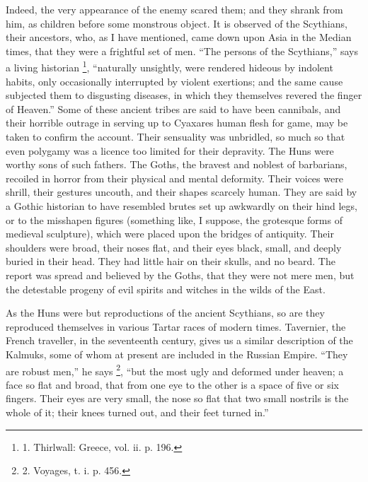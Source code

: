 Indeed, the very appearance of
the enemy scared them; and they shrank from him, as children before
some monstrous object. It is observed of the Scythians, their
ancestors, who, as I have mentioned, came down upon Asia in the Median
times, that they were a frightful set of men. ``The persons of the
Scythians,'' says a living historian \footnote{1. Thirlwall: Greece, vol. ii.
p. 196.}, ``naturally unsightly, were rendered hideous by indolent
habits, only occasionally interrupted by violent exertions; and the
same cause subjected them to disgusting diseases, in which they
themselves revered the finger of Heaven.'' Some of these ancient tribes
are said to have been cannibals, and their horrible outrage in serving
up to Cyaxares human flesh for game, may be taken to confirm the
account. Their sensuality was unbridled, so much so that even
polygamy was a licence too limited for their depravity. The Huns were
worthy sons of such fathers. The Goths, the bravest and noblest of
barbarians, recoiled in horror from their physical and mental
deformity. Their voices were shrill, their gestures uncouth, and their
shapes scarcely human. They are said by a Gothic historian to have
resembled brutes set up awkwardly on their hind legs, or to the
misshapen figures (something like, I suppose, the grotesque forms of
medieval sculpture), which were placed upon the bridges of antiquity.
Their shoulders were broad, their noses flat, and their eyes black,
small, and deeply buried in their head. They had little hair on their
skulls, and no beard. The report was spread and believed by the Goths,
that they were not mere men, but the detestable progeny of evil
spirits and witches in the wilds of the East.

As the Huns were but
reproductions of the ancient Scythians, so are they reproduced
themselves in various Tartar races of modern times. Tavernier, the
French traveller, in the seventeenth century, gives us a similar
description of the Kalmuks, some of whom at present are included in
the Russian Empire. ``They are robust men,'' he says \footnote{2.
Voyages, t. i. p. 456.}, ``but the most ugly and deformed under heaven; a face so flat
and broad, that from one eye to the other is a space of five or six
fingers. Their eyes are very small, the nose so flat that two small
nostrils is the whole of it; their knees turned out, and their feet
turned in.''

